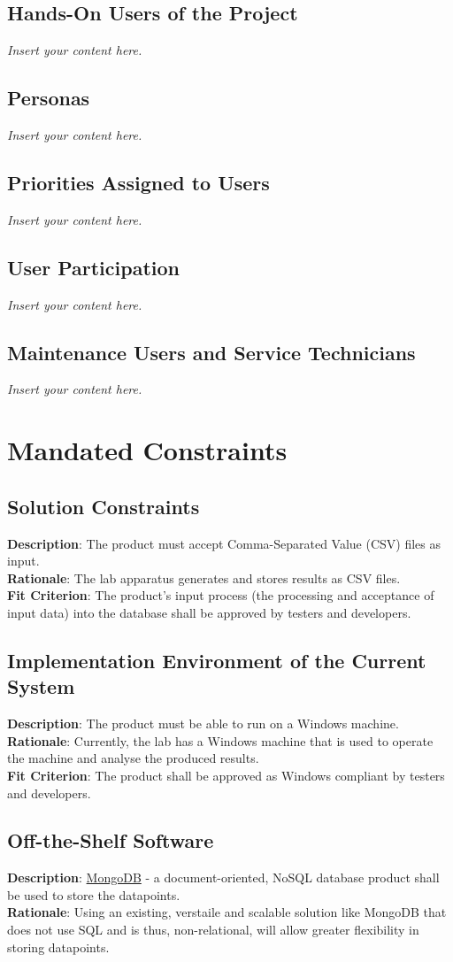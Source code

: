 \documentclass[12pt]{article}
\newcommand{\lips}{\textit{Insert your content here.}}
\begin{document}
\subsection{Hands-On Users of the Project}
\lips
\subsection{Personas}
\lips
\subsection{Priorities Assigned to Users}
\lips
\subsection{User Participation}
\lips
\subsection{Maintenance Users and Service Technicians}
\lips

\section{Mandated Constraints}
\subsection{Solution Constraints}
\textbf{Description}: The product must accept Comma-Separated Value (CSV) files as input.\\
\textbf{Rationale}: The lab apparatus generates and stores results as CSV files.\\
\textbf{Fit Criterion}: The product's input process (the processing and acceptance of input data) into the database shall be approved by testers and developers.

\subsection{Implementation Environment of the Current System}
\textbf{Description}: The product must be able to run on a Windows machine.\\
\textbf{Rationale}: Currently, the lab has a Windows machine that is used to operate the machine and analyse the produced results.\\
\textbf{Fit Criterion}: The product shall be approved as Windows compliant by testers and developers.

\subsection{Off-the-Shelf Software}
\textbf{Description}: \href{https://www.mongodb.com/}{MongoDB} - a document-oriented, NoSQL database product shall be used to store the datapoints.\\
\textbf{Rationale}: Using an existing, verstaile and scalable solution like MongoDB that does not use SQL and is thus, non-relational, will allow greater flexibility in storing datapoints.\\
\end{document}

